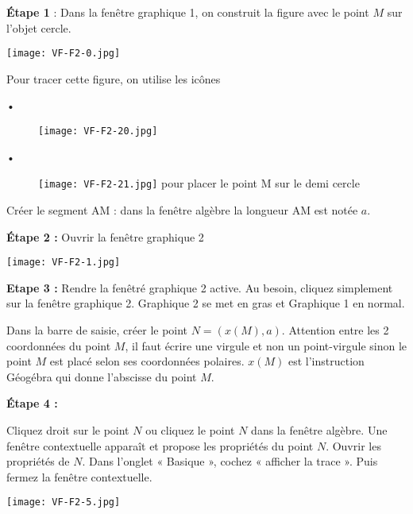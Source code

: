 \vspace{0.2cm}

\textbf{Étape 1} : Dans la fenêtre graphique 1, on construit la figure avec le point $M$ sur l'objet cercle.

\texttt{[image: VF-F2-0.jpg]}

Pour tracer cette figure, on utilise les icônes
\begin{description}
    \item[•] \texttt{[image: VF-F2-20.jpg]} 
    \item[•] \texttt{[image: VF-F2-21.jpg]}  pour placer le point M sur le demi cercle
\end{description}       
        
Créer le segment AM : dans la fenêtre algèbre la longueur AM est notée $a$.

\vspace{0.2cm}

\textbf{Étape 2 :}  Ouvrir la fenêtre graphique 2

\texttt{[image: VF-F2-1.jpg]} 

\vspace{0.2cm}

\textbf{Etape 3 :} Rendre la fenêtré graphique 2 active. Au besoin, cliquez simplement sur la fenêtre graphique 2. Graphique 2 se met en gras et Graphique 1 en normal.

\vspace{0.2cm}

Dans la barre de saisie, créer le point $N=(x(M),a)$. 
Attention entre les 2 coordonnées du point $M$, il faut écrire une virgule et non un point-virgule sinon le point $M$ est placé selon ses coordonnées polaires.
$x(M)$ est l'instruction Géogébra qui donne l'abscisse du point $M$.

\vspace{0.2cm}

\textbf{Étape 4 :}

\vspace{0.2cm}

\begin{minipage}{0.68\linewidth}
Cliquez droit sur le point $N$ ou cliquez le point $N$ dans la fenêtre algèbre. Une fenêtre contextuelle apparaît et propose les propriétés du point $N$.
Ouvrir les propriétés de $N$.
Dans l'onglet « Basique », cochez « afficher la trace ».
Puis fermez la fenêtre contextuelle.
\end{minipage}
\hfill
\begin{minipage}{0.28\linewidth}

\texttt{[image: VF-F2-5.jpg]} 

\end{minipage}
\vspace{0.2cm}

